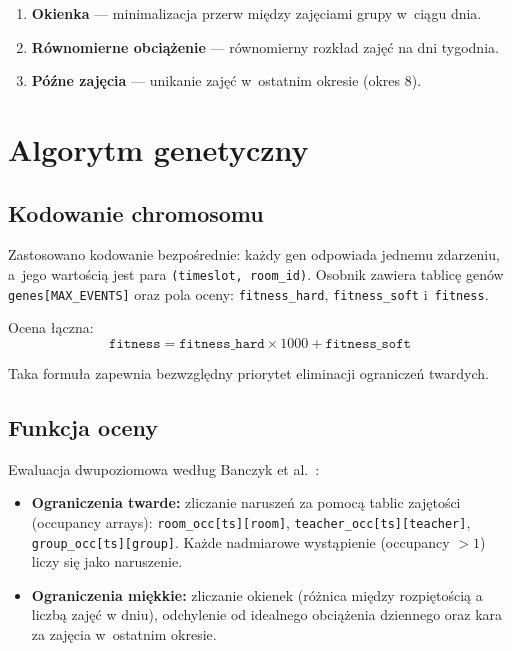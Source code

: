 \documentclass[12pt,a4paper]{article}
\begin{document}
\begin{enumerate}
  \item \textbf{Okienka} --- minimalizacja przerw mi\k{e}dzy zaj\k{e}ciami grupy w~ci\k{a}gu dnia.
  \item \textbf{R\'{o}wnomierne obci\k{a}\.{z}enie} --- r\'{o}wnomierny rozk\l{}ad zaj\k{e}\'{c} na dni tygodnia.
  \item \textbf{P\'{o}\'{z}ne zaj\k{e}cia} --- unikanie zaj\k{e}\'{c} w~ostatnim okresie (okres 8).
\end{enumerate}

\section{Algorytm genetyczny}

\subsection{Kodowanie chromosomu}

Zastosowano kodowanie bezpo\'{s}rednie: ka\.{z}dy gen odpowiada jednemu zdarzeniu, a~jego warto\'{s}ci\k{a} jest para \texttt{(timeslot, room\_id)}. Osobnik zawiera tablic\k{e} gen\'{o}w \texttt{genes[MAX\_EVENTS]} oraz pola oceny: \texttt{fitness\_hard}, \texttt{fitness\_soft} i~\texttt{fitness}.

Ocena {\l}\k{a}czna:
\begin{equation}
  \texttt{fitness} = \texttt{fitness\_hard} \times 1000 + \texttt{fitness\_soft}
\end{equation}

Taka formu\l{}a zapewnia bezwzgl\k{e}dny priorytet eliminacji ogranicze\'{n} twardych.

\subsection{Funkcja oceny}

Ewaluacja dwupoziomowa wed\l{}ug Banczyk et al.~\cite{banczyk}:

\begin{itemize}
  \item \textbf{Ograniczenia twarde:} zliczanie narusze\'{n} za pomoc\k{a} tablic zaj\k{e}to\'{s}ci (occupancy arrays): \texttt{room\_occ[ts][room]}, \texttt{teacher\_occ[ts][teacher]}, \texttt{group\_occ[ts][group]}. Ka\.{z}de nadmiarowe wyst\k{a}pienie (occupancy $> 1$) liczy si\k{e} jako naruszenie.
  \item \textbf{Ograniczenia mi\k{e}kkie:} zliczanie okienek (r\'{o}\.{z}nica mi\k{e}dzy rozpi\k{e}to\'{s}ci\k{a} a liczb\k{a} zaj\k{e}\'{c} w dniu), odchylenie od idealnego obci\k{a}\.{z}enia dziennego oraz kara za zaj\k{e}cia w~ostatnim okresie.
\end{itemize}
\end{document}
